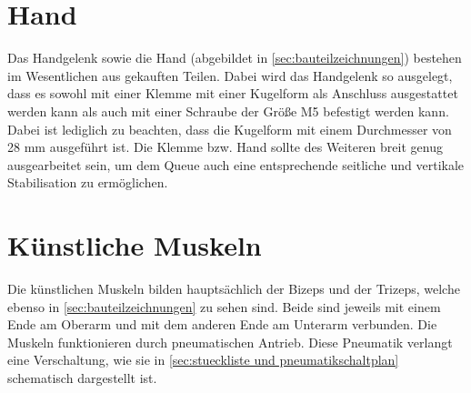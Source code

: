 	\section{Hand}
		Das Handgelenk sowie die Hand (abgebildet in \cref{sec:bauteilzeichnungen}) bestehen im Wesentlichen aus gekauften Teilen.
		Dabei wird das Handgelenk so ausgelegt, dass es sowohl mit einer Klemme mit einer Kugelform als Anschluss ausgestattet werden kann als auch mit einer Schraube der Größe M5 befestigt werden kann.
		Dabei ist lediglich zu beachten, dass die Kugelform mit einem Durchmesser von 28 mm ausgeführt ist.
		Die Klemme bzw. Hand sollte des Weiteren breit genug ausgearbeitet sein, um dem Queue auch eine entsprechende seitliche und vertikale Stabilisation zu ermöglichen.
	
	\section{Künstliche Muskeln}
		Die künstlichen Muskeln bilden hauptsächlich der Bizeps und der Trizeps, welche ebenso in \cref{sec:bauteilzeichnungen} zu sehen sind.
		Beide sind jeweils mit einem Ende am Oberarm und mit dem anderen Ende am Unterarm verbunden.
		Die Muskeln funktionieren durch pneumatischen Antrieb.
		Diese Pneumatik verlangt eine Verschaltung, wie sie in \cref{sec:stueckliste und pneumatikschaltplan} schematisch dargestellt ist.